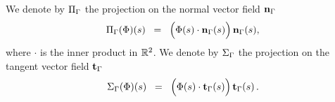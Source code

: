 
\begin{defn}[{\bf Projectors}]
We denote by $\Pi_\Gamma$ the  projection on the normal vector field $ \mathbf{n}_\Gamma$
\begin{equation}\label{normal-proj}
	\Pi_\Gamma (\Phi)(s) \;\;=\;\; \Big( \Phi(s) \cdot \mathbf{n}_\Gamma(s) \Big)\, \mathbf{n}_\Gamma(s),
\end{equation}
where $\cdot$ is the inner product in $\mathbb{R}^2$. 
We denote by $\Sigma_\Gamma$ the  projection on the tangent vector  field $\mathbf{t}_\Gamma$
\begin{equation}\label{tangent-proj}
	\Sigma_\Gamma (\Phi)(s) \;\;=\;\; \Big( \Phi(s) \cdot \mathbf{t}_\Gamma(s) \Big)\, \mathbf{t}_\Gamma(s)\, .
\end{equation}
\end{defn}

